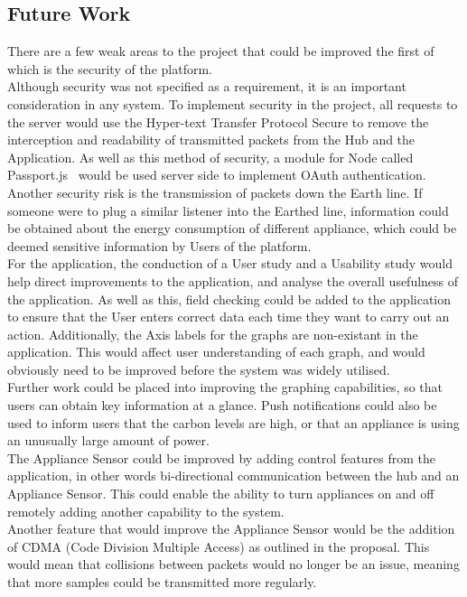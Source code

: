 \documentclass[preprint,12pt,3p]{elsarticle}
\begin{document}
\subsection{Future Work}
There are a few weak areas to the project that could be improved the first of which is the security of the platform.\\ 
Although security was not specified as a requirement, it is an important consideration in any system. To implement security in the project, all requests to the server would use the Hyper-text Transfer Protocol Secure to remove the interception and readability of transmitted packets from the Hub and the Application. As well as this method of security, a module for Node called Passport.js~\cite{passportjs} would be used server side to implement OAuth authentication.\\
Another security risk is the transmission of packets down the Earth line. If someone were to plug a similar listener into the Earthed line, information could be obtained about the energy consumption of different appliance, which could be deemed sensitive information by Users of the platform.\\
For the application, the conduction of a User study and a Usability study would help direct improvements to the application, and analyse the overall usefulness of the application. As well as this, field checking could be added to the application to ensure that the User enters correct data each time they want to carry out an action. Additionally, the Axis labels for the graphs are non-existant in the application. This would affect user understanding of each graph, and would obviously need to be improved before the system was widely utilised. \\
Further work could be placed into improving the graphing capabilities, so that users can obtain key information at a glance. Push notifications could also be used to inform users that the carbon levels are high, or that an appliance is using an unusually large amount of power.\\
The Appliance Sensor could be improved by adding control features from the application, in other words bi-directional communication between the hub and an Appliance Sensor. This could enable the ability to turn appliances on and off remotely adding another capability to the system.\\
Another feature that would improve the Appliance Sensor would be the addition of CDMA (Code Division Multiple Access) as outlined in the proposal. This would mean that collisions between packets would no longer be an issue, meaning that more samples could be transmitted more regularly.\\
\end{document}
